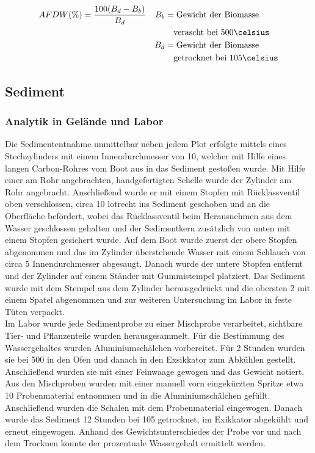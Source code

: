\begin{align*}
 AFDW(\%)&=\frac{100(B_d-B_b)}{B_d} & B_b &=\text{Gewicht der Biomasse}\\ 
 & &     &\text{\quad verascht bei 500\celsius}\\
 & & B_d &=\text{Gewicht der Biomasse}\\
 & &     &\text{\quad getrocknet bei 105\celsius}\\
\end{align*}




\subsection{Sediment}
\subsubsection{Analytik in Gelände und Labor}
Die Sedimententnahme unmittelbar neben jedem Plot erfolgte mittels eines Stechzylinders mit einem Innendurchmesser von \unit{10}{\centi\metre}, welcher mit Hilfe eines langen Carbon-Rohres vom Boot aus in das Sediment gestoßen wurde. Mit Hilfe einer am Rohr angebrachten, handgefertigten Schelle wurde der Zylinder am Rohr angebracht. Anschließend wurde er mit einem Stopfen mit Rücklassventil oben verschlossen, circa \unit{10}{\centi\metre} lotrecht ins Sediment geschoben und an die Oberfläche befördert, wobei das Rücklassventil beim Herausnehmen aus dem Wasser geschlossen gehalten und der Sedimentkern zusätzlich von unten mit einem Stopfen gesichert wurde. Auf dem Boot wurde zuerst der obere Stopfen abgenommen und das im Zylinder überstehende Wasser mit einem Schlauch von circa \unit{5}{\milli\metre} Innendurchmesser abgesaugt. Danach wurde der untere Stopfen entfernt und der Zylinder auf einem Ständer mit Gummistempel platziert. Das Sediment wurde mit dem Stempel aus dem Zylinder herausgedrückt und die obersten \unit{2}{\centi\metre} mit einem Spatel abgenommen und zur weiteren Untersuchung im Labor in feste Tüten verpackt.\\
Im Labor wurde jede Sedimentprobe zu einer Mischprobe verarbeitet, sichtbare Tier- und Pflanzenteile wurden herausgesammelt. Für die Bestimmung des Wassergehaltes wurden Aluminiumschälchen vorbereitet. Für 2 Stunden wurden sie bei \unit{500}{\celsius} in den Ofen und danach in den Exsikkator zum Abkühlen gestellt. Anschließend wurden sie mit einer Feinwaage gewogen und das Gewicht notiert.\\
Aus den Mischproben wurden mit einer manuell vorn eingekürzten Spritze etwa \unit{10}{\milli\litre} Probenmaterial entnommen und in die Aluminiumschälchen gefüllt. Anschließend wurden die Schalen mit dem Probenmaterial eingewogen. Danach wurde das Sediment 12 Stunden bei \unit{105}{\celsius} getrocknet, im Exikkator abgekühlt und erneut eingewogen. Anhand des Gewichtsunterschiedes der Probe vor und nach dem Trocknen konnte der prozentuale Wassergehalt ermittelt werden.\\
